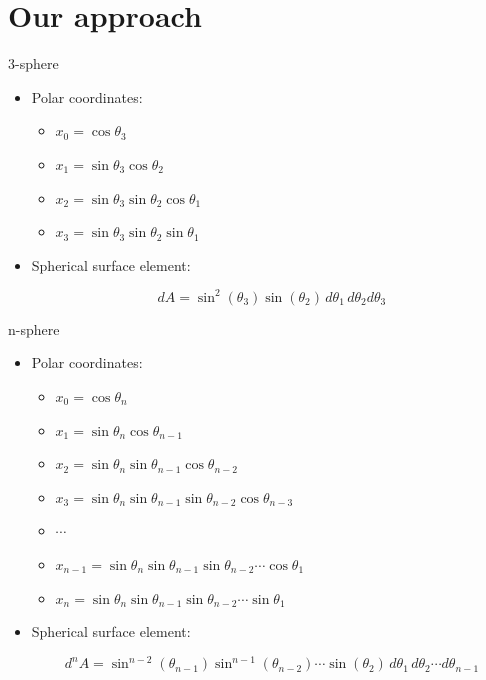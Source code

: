 \documentclass[10pt,ignorenonframetext,serif,onlymath]{beamer}
\begin{document}
\hypertarget{our-approach}{%
\section{Our approach}\label{our-approach}}

\begin{frame}{3-sphere}
\protect\hypertarget{sphere}{}

\begin{itemize}
\item
  Polar coordinates:

  \begin{itemize}
  \item
    \(x_0 = \cos\theta_3\)
  \item
    \(x_1 = \sin\theta_3 \cos\theta_2\)
  \item
    \(x_2 = \sin\theta_3 \sin\theta_2 \cos\theta_1\)
  \item
    \(x_3 = \sin\theta_3 \sin\theta_2 \sin\theta_1\)
  \end{itemize}
\item
  Spherical surface element:

  \[dA  = \sin^{2}(\theta_3)\sin(\theta_2)\,d\theta_1 \, d\theta_2 d\theta_3\]
\end{itemize}

\end{frame}

\begin{frame}{n-sphere}
\protect\hypertarget{n-sphere}{}

\begin{itemize}
\item
  Polar coordinates:

  \begin{itemize}
  \item
    \(x_0 = \cos\theta_n\)
  \item
    \(x_1 = \sin\theta_n \cos\theta_{n-1}\)
  \item
    \(x_2 = \sin\theta_n \sin\theta_{n-1} \cos\theta_{n-2}\)
  \item
    \(x_3 = \sin\theta_n \sin\theta_{n-1} \sin\theta_{n-2} \cos\theta_{n-3}\)
  \item
    \(\cdots\)
  \item
    \(x_{n-1} = \sin\theta_n \sin\theta_{n-1} \sin\theta_{n-2} \cdots \cos\theta_1\)
  \item
    \(x_n = \sin\theta_n \sin\theta_{n-1} \sin\theta_{n-2} \cdots \sin\theta_1\)
  \end{itemize}
\item
  Spherical surface element:

  \[d^nA  = \sin^{n-2}(\theta_{n-1})\sin^{n-1}(\theta_{n-2})\cdots \sin(\theta_{2})\,d\theta_1 \, d\theta_2\cdots d\theta_{n-1}\]
\end{itemize}

\end{frame}
\end{document}
